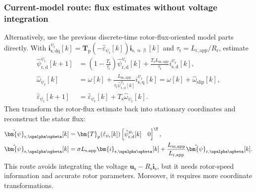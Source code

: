 \begin{frame}
    \frametitle{Current-model route: flux estimates without voltage integration}
    Alternatively, use the previous discrete-time rotor-flux-oriented model parts directly. With
    $\bm{i}^{\psi_\mathrm{r}}_{\mathrm{s,dq}}[k]=\bm{T}_\mathrm{p}(-\hat{\varepsilon}_{\psi_\mathrm{r}}[k])\bm{i}_{\mathrm{s},\upalpha\upbeta}[k]$ and $\tau_\mathrm{r}=L_\mathrm{r,app}/R_\mathrm{r}$, estimate
    \begin{equation}
        \begin{aligned}
            \hat{\psi}^{\psi_\mathrm{r}}_{\mathrm{r,d}}[k+1]
             & =\left(1-\frac{T_\mathrm{s}}{\tau_\mathrm{r}}\right)
            \hat{\psi}^{\psi_\mathrm{r}}_{\mathrm{r,d}}[k]
            +\frac{T_\mathrm{s}L_\mathrm{m,app}}{\tau_\mathrm{r}}i^{\psi_\mathrm{r}}_{\mathrm{s,d}}[k],                                                                                              \\
            \hat{\omega}_{\psi_\mathrm{r}}[k]
             & =\omega[k]+\frac{L_\mathrm{m,app}}{\tau_\mathrm{r}\hat{\psi}^{\psi_\mathrm{r}}_{\mathrm{r,d}}[k]}i^{\psi_\mathrm{r}}_{\mathrm{s,q}}[k] = \omega[k] + \hat{\omega}_{\mathrm{slip}}[k], \\
            \hat{\varepsilon}_{\psi_\mathrm{r}}[k+1]
             & =\hat{\varepsilon}_{\psi_\mathrm{r}}[k]+T_\mathrm{s}\hat{\omega}_{\psi_\mathrm{r}}[k].
        \end{aligned}
        \label{eq:IM_DTC_rotor_flux_current_model_v4}
    \end{equation}\pause%
    Then transform the rotor-flux estimate back into stationary coordinates and reconstruct the stator flux:
    \begin{equation}
        \begin{aligned}
            \hat{\bm{\psi}}_{\mathrm{r},\upalpha\upbeta}[k]
             & =\bm{T}_\mathrm{p}(\hat{\varepsilon}_{\psi_\mathrm{r}}[k])
            \begin{bmatrix}\hat{\psi}^{\psi_\mathrm{r}}_{\mathrm{r,d}}[k] & 0\end{bmatrix}^{\T}, \\
            \hat{\bm{\psi}}_{\mathrm{s},\upalpha\upbeta}[k]
             & =\sigma L_\mathrm{s,app}\bm{i}_{\mathrm{s},\upalpha\upbeta}[k]
            +\frac{L_\mathrm{m,app}}{L_\mathrm{r,app}}\hat{\bm{\psi}}_{\mathrm{r},\upalpha\upbeta}[k].
        \end{aligned}
        \label{eq:IM_DTC_stator_flux_from_current_model_v4}
    \end{equation}\pause%
    This route avoids integrating the voltage $\bm{u}_\mathrm{s}-R_\mathrm{s}\bm{i}_\mathrm{s}$, but it needs rotor-speed information and accurate rotor parameters. Moreover, it requires more coordinate transformations.
\end{frame}

